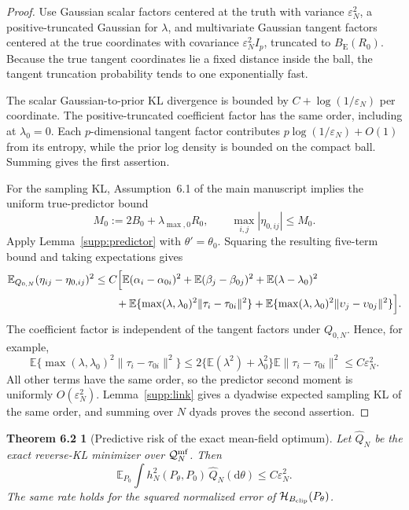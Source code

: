 \documentclass[
  12pt]{article}
\theoremstyle{definition}
\theoremstyle{plain}
\newtheorem*{mainthmvariational}{Theorem 6.2}
\newcommand{\E}{\mathbb E}
\newcommand{\calQ}{\mathcal Q}
\newcommand{\dd}{\mathrm d}
\newcommand{\eps}{\varepsilon}
\begin{document}
\begin{proof}
	Use Gaussian scalar factors centered at the truth with variance $\eps_N^2$, a positive-truncated Gaussian for $\lambda$, and multivariate Gaussian tangent factors centered at the true coordinates with covariance $\eps_N^2I_p$, truncated to $B_{\mathrm E}(R_0)$. Because the true tangent coordinates lie a fixed distance inside the ball, the tangent truncation probability tends to one exponentially fast.
	
	The scalar Gaussian-to-prior KL divergence is bounded by $C+\log(1/\eps_N)$ per coordinate. The positive-truncated coefficient factor has the same order, including at $\lambda_0=0$. Each $p$-dimensional tangent factor contributes $p\log(1/\eps_N)+O(1)$ from its entropy, while the prior log density is bounded on the compact ball. Summing gives the first assertion.
	
	For the sampling KL, Assumption~6.1 of the main manuscript implies the uniform true-predictor bound
	\[
	M_0:=2B_0+\lambda_{\max,0}R_0,
	\qquad
	\max_{i,j}|\eta_{0,ij}|\le M_0.
	\]
	Apply Lemma~\ref{supp:predictor} with $\theta'=\theta_0$. Squaring the resulting five-term bound and taking expectations gives
	\begin{align*}
		\E_{Q_{0,N}}(\eta_{ij}-\eta_{0,ij})^2
		&\le C\Bigl[
		\E(\alpha_i-\alpha_{0i})^2+
		\E(\beta_j-\beta_{0j})^2+
		\E(\lambda-\lambda_0)^2\\
		&\qquad+
		\E\{\max(\lambda,\lambda_0)^2\|\tau_i-\tau_{0i}\|^2\}
		+
		\E\{\max(\lambda,\lambda_0)^2\|\upsilon_j-\upsilon_{0j}\|^2\}
		\Bigr].
	\end{align*}
	The coefficient factor is independent of the tangent factors under $Q_{0,N}$. Hence, for example,
	\[
	\E\{\max(\lambda,\lambda_0)^2\|\tau_i-\tau_{0i}\|^2\}
	\le 2\{\E(\lambda^2)+\lambda_0^2\}\E\|\tau_i-\tau_{0i}\|^2
	\le C\eps_N^2.
	\]
	All other terms have the same order, so the predictor second moment is uniformly $O(\eps_N^2)$. Lemma~\ref{supp:link} gives a dyadwise expected sampling KL of the same order, and summing over $N$ dyads proves the second assertion.
\end{proof}

\begin{mainthmvariational}[Predictive risk of the exact mean-field optimum]
	Let $\widehat Q_N$ be the exact reverse-KL minimizer over $\calQ_N^{\rm mf}$. Then
	\[
	\E_{P_0}\int h_N^2(P_\theta,P_0)\,\widehat Q_N(\dd\theta)
	\le C\eps_N^2.
	\]
	The same rate holds for the squared normalized error of $\mathcal H_{B_{\rm clip}}(P_\theta)$.
\end{mainthmvariational}
\end{document}

